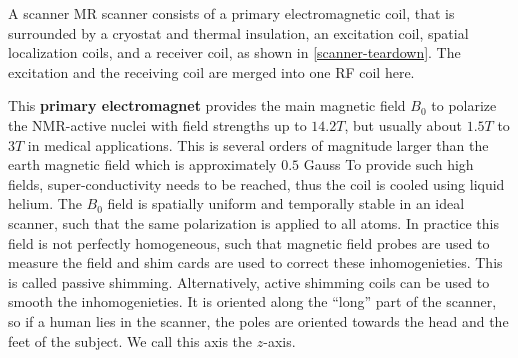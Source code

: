 A scanner MR scanner consists of a primary electromagnetic coil, that is surrounded by a cryostat and thermal insulation, an excitation coil, spatial localization coils, and a receiver coil, as shown in \ref{scanner-teardown}.
The excitation and the receiving coil are merged into one RF coil here. \\

This \textbf{primary electromagnet} provides the main magnetic field $B_0$ to polarize the NMR-active nuclei with field strengths up to $14.2 T$, but usually about $1.5 T$ to $3 T$ in medical applications.
This is several orders of magnitude larger than the earth magnetic field which is approximately $0.5$ Gauss
To provide such high fields, super-conductivity needs to be reached, thus the coil is cooled using liquid helium.
The $B_0$ field is spatially uniform and temporally stable in an ideal scanner, such that the same polarization is applied to all atoms.
In practice this field is not perfectly homogeneous, such that magnetic field probes are used to measure the field and shim cards are used to correct these inhomogenieties.
This is called passive shimming.
Alternatively, active shimming coils can be used to smooth the inhomogenieties.
It is oriented along the ``long'' part of the scanner, so if a human lies in the scanner, the poles are oriented towards the head and the feet of the subject.
We call this axis the $z$-axis. \\


